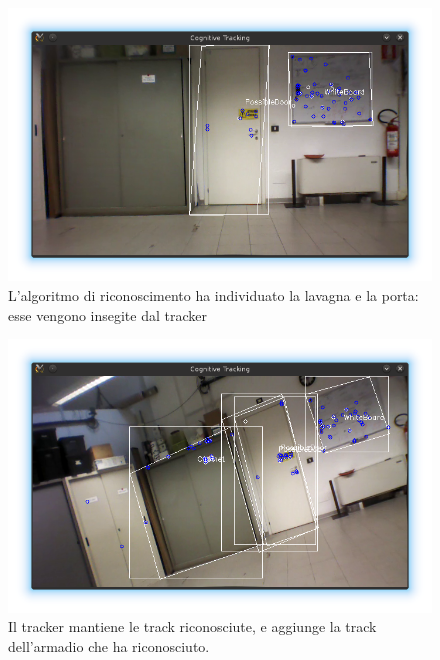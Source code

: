 \begin{figure}[ht]
  \includegraphics[width=\textwidth]{immagini/risultati/tracker1}
  \caption[Immagine del tracker]{L'algoritmo di riconoscimento ha individuato la lavagna e la porta: esse vengono insegite dal tracker}
  \label{fig:tracker1}
\end{figure}

\begin{figure}[ht]
  \includegraphics[width=\textwidth]{immagini/risultati/tracker2}
  \caption[Track precedenti da un nuovo punto di vista]{Il tracker mantiene le track riconosciute, e aggiunge la track dell'armadio che ha riconosciuto.}
  \label{fig:tracker2}
\end{figure}